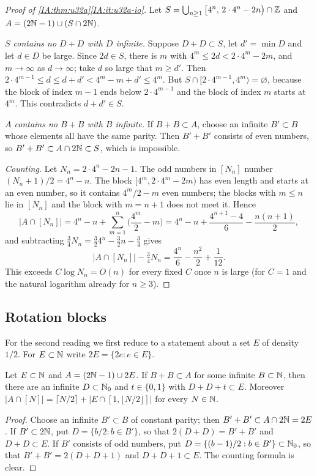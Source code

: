 \begin{proof}[Proof of \cref{IA:thm:u32a}\ref{IA:it:u32a-io}]
Let $S=\bigcup_{n\ge1}\big[4^n,\,2\cdot4^n-2n\big)\cap\mathbb{Z}$ and $A=(2\mathbb{N}-1)\cup(S\cap2\mathbb{N})$.

\emph{$S$ contains no $D+D$ with $D$ infinite.} Suppose $D+D\subset S$, let $d'=\min D$ and let
$d\in D$ be large. Since $2d\in S$, there is $m$ with $4^m\le 2d<2\cdot4^m-2m$, and $m\to\infty$ as
$d\to\infty$; take $d$ so large that $m\ge d'$. Then $2\cdot 4^{m-1}\le d\le d+d'<4^m-m+d'\le 4^m$.
But $S\cap[2\cdot4^{m-1},4^m)=\varnothing$, because the block of index $m-1$ ends below
$2\cdot4^{m-1}$ and the block of index $m$ starts at $4^m$. This contradicts $d+d'\in S$.

\emph{$A$ contains no $B+B$ with $B$ infinite.} If $B+B\subset A$, choose an infinite $B'\subset B$
whose elements all have the same parity. Then $B'+B'$ consists of even numbers, so
$B'+B'\subset A\cap2\mathbb{N}\subset S$, which is impossible.

\emph{Counting.} Let $N_n=2\cdot4^n-2n-1$. The odd numbers in $[N_n]$ number $(N_n+1)/2=4^n-n$. The
block $[4^m,2\cdot4^m-2m)$ has even length and starts at an even number, so it contains
$4^m/2-m$ even numbers; the blocks with $m\le n$ lie in $[N_n]$ and the block with $m=n+1$ does not
meet it. Hence
\[
|A\cap[N_n]|=4^n-n+\sum_{m=1}^n\Big(\frac{4^m}2-m\Big)=4^n-n+\frac{4^{n+1}-4}{6}-\frac{n(n+1)}2,
\]
and subtracting $\frac34N_n=\frac32 4^n-\frac32n-\frac34$ gives
\[
|A\cap[N_n]|-\tfrac34N_n=\frac{4^n}{6}-\frac{n^2}{2}+\frac1{12}.
\]
This exceeds $C\log N_n=O(n)$ for every fixed $C$ once $n$ is large (for $C=1$ and the natural
logarithm already for $n\ge3$).
\end{proof}

\subsection{Rotation blocks}
For the second reading we first reduce to a statement about a set $E$ of density $1/2$. For
$E\subset\mathbb{N}$ write $2E=\{2e:e\in E\}$.

\begin{lemma}\label{IA:lem:parity}
Let $E\subset\mathbb{N}$ and $A=(2\mathbb{N}-1)\cup2E$. If $B+B\subset A$ for some infinite $B\subset\mathbb{N}$, then there
are an infinite $D\subset\mathbb{N}_0$ and $t\in\{0,1\}$ with $D+D+t\subset E$. Moreover
$|A\cap[N]|=\lceil N/2\rceil+|E\cap[1,\lfloor N/2\rfloor]|$ for every $N\in\mathbb{N}$.
\end{lemma}

\begin{proof}
Choose an infinite $B'\subset B$ of constant parity; then $B'+B'\subset A\cap2\mathbb{N}=2E$. If $B'\subset
2\mathbb{N}$, put $D=\{b/2:b\in B'\}$, so that $2(D+D)=B'+B'$ and $D+D\subset E$. If $B'$ consists of odd
numbers, put $D=\{(b-1)/2:b\in B'\}\subset\mathbb{N}_0$, so that $B'+B'=2(D+D+1)$ and $D+D+1\subset E$. The
counting formula is clear.
\end{proof}

